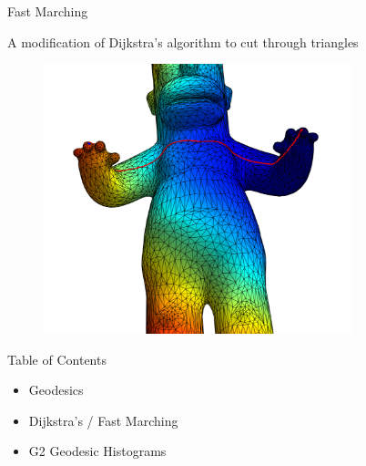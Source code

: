 \documentclass{beamer}
\begin{document}
\begin{frame}{Fast Marching}

A modification of Dijkstra's algorithm to cut through triangles

\begin{figure}[t]
    \includegraphics[width=0.8\textwidth]{HomerContinuousRFingerLFinger.pdf}
\end{figure}


\end{frame}

\begin{frame}{Table of Contents}

\begin{itemize}[label=$\vartriangleright$]
	\item Geodesics
\end{itemize}

\begin{itemize}[label=$\vartriangleright$]
	\item Dijkstra's / Fast Marching
\end{itemize}

\begin{itemize}[label=$\blacktriangleright$]
	\item G2 Geodesic Histograms
\end{itemize}

\end{frame}
\end{document}
